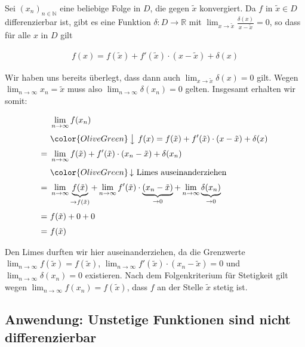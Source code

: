 \documentclass[fontsize=9pt,
               parskip=half-,
               DIV=14,
               listof=chapterentry,
               tocflat]{scrbook}
\begin{document}
\begin{proof*}
Sei $(x_{n})_{n\in \mathbb {N} }$ eine beliebige Folge in $D$, die gegen ${\tilde {x}}$ konvergiert. Da $f$ in ${\tilde {x}}\in D$ differenzierbar ist, gibt es eine Funktion $\delta :D\to \mathbb {R} $ mit $\lim _{x\to {\tilde {x}}}{\tfrac {\delta (x)}{x-{\tilde {x}}}}=0$, so dass für alle $x$ in $D$ gilt

\begin{align*}
f(x)=f({\tilde {x}})+f'({\tilde {x}})\cdot (x-{\tilde {x}})+\delta (x)
\end{align*}

Wir haben uns bereits überlegt, dass dann auch $\lim _{x\to {\tilde {x}}}\delta (x)=0$ gilt. Wegen $\lim _{n\to \infty }{x_{n}}={\tilde {x}}$ muss also $\lim _{n\to \infty }{\delta (x_{n})}=0$ gelten. Insgesamt erhalten wir somit:

\begin{align*}
&\lim _{n\to \infty }{f(x_{n})}\\[0.3em]&{\color {OliveGreen}\left\downarrow \ f(x)=f({\tilde {x}})+f'({\tilde {x}})\cdot (x-{\tilde {x}})+\delta (x)\right.}\\[0.3em]=\ &\lim _{n\to \infty }{f({\tilde {x}})+f'({\tilde {x}})\cdot (x_{n}-{\tilde {x}})+\delta (x_{n})}\\[0.3em]&{\color {OliveGreen}\left\downarrow \ {\text{Limes auseinanderziehen}}\right.}\\[0.3em]=\ &\lim _{n\to \infty }\underbrace {f({\tilde {x}})} _{\to f({\tilde {x}})}+\lim _{n\to \infty }f'({\tilde {x}})\cdot \underbrace {(x_{n}-{\tilde {x}})} _{\to 0}+\lim _{n\to \infty }\underbrace {\delta (x_{n})} _{\to 0}\\[0.3em]=\ &f({\tilde {x}})+0+0\\[0.3em]=\ &f({\tilde {x}})
\end{align*}

Den Limes durften wir hier auseinanderziehen, da die Grenzwerte $\lim _{n\to \infty }{f({\tilde {x}})}=f({\tilde {x}})$, $\lim _{n\to \infty }{f'({\tilde {x}})\cdot (x_{n}-{\tilde {x}})}=0$ und $\lim _{n\to \infty }{\delta (x_{n})}=0$ existieren. Nach dem Folgenkriterium für Stetigkeit gilt wegen $\lim _{n\to \infty }{f(x_{n})}=f({\tilde {x}})$, dass $f$ an der Stelle ${\tilde {x}}$ stetig ist.

\end{proof*}

\subsection{Anwendung: Unstetige Funktionen sind nicht differenzierbar}
\end{document}
